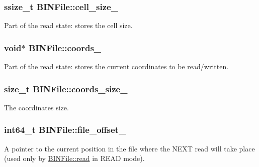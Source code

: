 \subsubsection[{cell\+\_\+size\+\_\+}]{\setlength{\rightskip}{0pt plus 5cm}ssize\+\_\+t B\+I\+N\+File\+::cell\+\_\+size\+\_\+\hspace{0.3cm}{\ttfamily [private]}}\label{classBINFile_aa6035d4e2e3877f57c1b15924e22c9d0}
Part of the read state\+: stores the cell size. \hypertarget{classBINFile_a8af11765bb8744748a812e78b15e22ac}{}
\subsubsection[{coords\+\_\+}]{\setlength{\rightskip}{0pt plus 5cm}void$\ast$ B\+I\+N\+File\+::coords\+\_\+\hspace{0.3cm}{\ttfamily [private]}}\label{classBINFile_a8af11765bb8744748a812e78b15e22ac}
Part of the read state\+: stores the current coordinates to be read/written. \hypertarget{classBINFile_ab109a798204ffecf9c85d7d9e8e5c469}{}
\subsubsection[{coords\+\_\+size\+\_\+}]{\setlength{\rightskip}{0pt plus 5cm}size\+\_\+t B\+I\+N\+File\+::coords\+\_\+size\+\_\+\hspace{0.3cm}{\ttfamily [private]}}\label{classBINFile_ab109a798204ffecf9c85d7d9e8e5c469}
The coordinates size. \hypertarget{classBINFile_af357b1564acccf461dfdb846249a35e9}{}
\subsubsection[{file\+\_\+offset\+\_\+}]{\setlength{\rightskip}{0pt plus 5cm}int64\+\_\+t B\+I\+N\+File\+::file\+\_\+offset\+\_\+\hspace{0.3cm}{\ttfamily [private]}}\label{classBINFile_af357b1564acccf461dfdb846249a35e9}
A pointer to the current position in the file where the N\+E\+X\+T read will take place (used only by \hyperlink{classBINFile_a538f9f21efe941296fef850a704f57a2}{B\+I\+N\+File\+::read} in R\+E\+A\+D mode). \hypertarget{classBINFile_abcaf9d032fcac353059a72244120e9fa}{}
